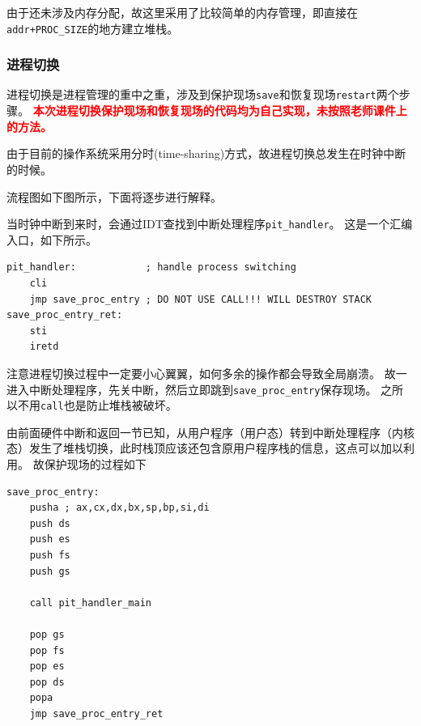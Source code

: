 \documentclass[logo,reportComp]{thesis}
\begin{document}
由于还未涉及内存分配，故这里采用了比较简单的内存管理，即直接在\verb'addr+PROC_SIZE'的地方建立堆栈。

\subsubsection{进程切换}
进程切换是进程管理的重中之重，涉及到保护现场\verb'save'和恢复现场\verb'restart'两个步骤。
\textcolor{red}{\textbf{本次进程切换保护现场和恢复现场的代码均为自己实现，未按照老师课件上的方法。}}

由于目前的操作系统采用分时(time-sharing)方式，故进程切换总发生在时钟中断的时候。

流程图如下图所示，下面将逐步进行解释。

当时钟中断到来时，会通过IDT查找到中断处理程序\verb'pit_handler'。
这是一个汇编入口，如下所示。
\begin{lstlisting}[language={[x86masm]Assembler}]
pit_handler:            ; handle process switching
	cli
	jmp save_proc_entry ; DO NOT USE CALL!!! WILL DESTROY STACK
save_proc_entry_ret:
	sti
	iretd
\end{lstlisting}

注意进程切换过程中一定要小心翼翼，如何多余的操作都会导致全局崩溃。
故一进入中断处理程序，先关中断，然后立即跳到\verb'save_proc_entry'保存现场。
之所以不用\verb'call'也是防止堆栈被破坏。

由前面硬件中断和返回一节已知，从用户程序（用户态）转到中断处理程序（内核态）发生了堆栈切换，此时栈顶应该还包含原用户程序栈的信息，这点可以加以利用。
故保护现场的过程如下
\begin{lstlisting}[language={[x86masm]Assembler}]
save_proc_entry:
	pusha ; ax,cx,dx,bx,sp,bp,si,di
	push ds
	push es
	push fs
	push gs

	call pit_handler_main

	pop gs
	pop fs
	pop es
	pop ds
	popa
	jmp save_proc_entry_ret
\end{lstlisting}
\end{document}
